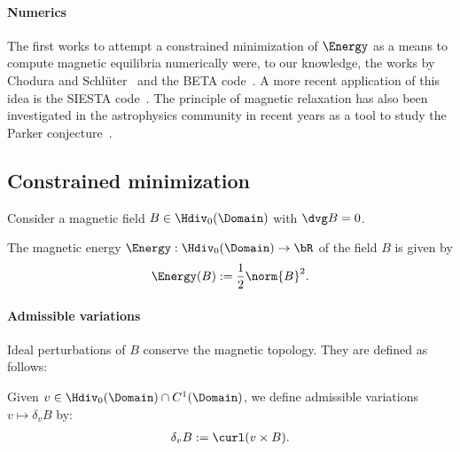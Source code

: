 \documentclass[%
 reprint,
 superscriptaddress,
 amsmath,amssymb,
 aps, nofootinbib, floatfix]{revtex4-2}
\begin{document}
\paragraph{Numerics}
The first works to attempt a constrained minimization of $\Energy$ as a means to compute magnetic equilibria numerically were, to our knowledge, the works by Chodura and Schlüter~\cite{chodura_3d_1981} and the BETA code~\cite{bauer_computational_1978, bauer_magnetohydrodynamic_1984}. 
%
A more recent application of this idea is the SIESTA code~\cite{hirshman_siesta_2011}. The principle of magnetic relaxation has also been investigated in the astrophysics community in recent years as a tool to study the Parker conjecture~\cite{pontin_parker_2020, smiet_ideal_2017, he_topology-preserving_2025, pontin_lagrangian_2009, candelaresi_mimetic_2014, mao2026structure}.

\subsection{Constrained minimization}
\label{sec:constrained_minimization}

Consider a magnetic field $B \in \Hdiv_0(\Domain)$ with $\dvg B = 0$.
\begin{definition}
\label{def:MagneticEnergy}
    The magnetic energy $\Energy: \Hdiv_0(\Domain) \rightarrow \bR$ of the field $B$ is given by
    \begin{align}
    \label{eq:energy}
        \Energy(B) := \frac{1}{2} \norm{B}^2.
    \end{align} 
\end{definition}

\paragraph{Admissible variations}
Ideal perturbations of $B$ conserve the magnetic topology. They are defined as follows:
\begin{definition}
\label{def:AdmissibleVariations}
    Given $v \in \Hdiv_0 (\Domain)\cap C^1(\Domain)$, we define admissible variations $v \mapsto \delta_v B$ by:
    \begin{align}
        \delta_v B := \curl (v \times B).
    \end{align}
\end{definition}
\end{document}
